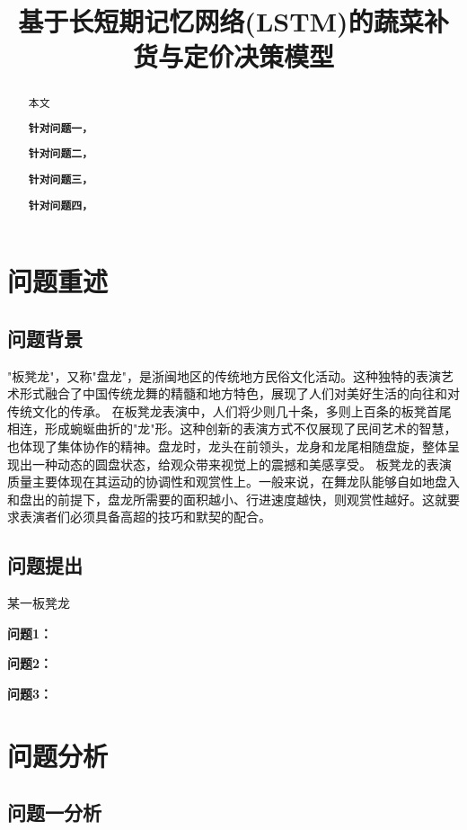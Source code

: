 \documentclass[withoutpreface,bwprint]{cumcmthesis} %
\title{基于长短期记忆网络(LSTM)的蔬菜补货与定价决策模型}
\begin{document}
\maketitle
\nocite{*}


\begin{abstract}
本文

    \textbf{针对问题一，}

    \textbf{针对问题二，}

    \textbf{针对问题三，}

    \textbf{针对问题四，}

\end{abstract}

\section{问题重述}

\subsection{问题背景}
"板凳龙"，又称"盘龙"，是浙闽地区的传统地方民俗文化活动。这种独特的表演艺术形式融合了中国传统龙舞的精髓和地方特色，展现了人们对美好生活的向往和对传统文化的传承。
在板凳龙表演中，人们将少则几十条，多则上百条的板凳首尾相连，形成蜿蜒曲折的"龙"形。这种创新的表演方式不仅展现了民间艺术的智慧，也体现了集体协作的精神。盘龙时，龙头在前领头，龙身和龙尾相随盘旋，整体呈现出一种动态的圆盘状态，给观众带来视觉上的震撼和美感享受。
板凳龙的表演质量主要体现在其运动的协调性和观赏性上。一般来说，在舞龙队能够自如地盘入和盘出的前提下，盘龙所需要的面积越小、行进速度越快，则观赏性越好。这就要求表演者们必须具备高超的技巧和默契的配合。


\subsection{问题提出}
某一板凳龙

\textbf{问题1：}

\textbf{问题2：}

\textbf{问题3：}

\section{问题分析}

\subsection{问题一分析}
\end{document}
